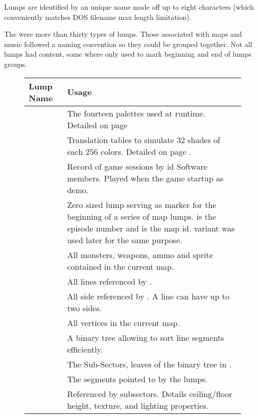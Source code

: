 Lumps are identified by an unique name made off up to eight characters (which conveniently matches DOS filename max length limitation).\\
\par
{}
\par
The were more than thirty types of lumps. Those associated with maps and music followed a naming convention so they could be grouped together. Not all lumps had content, some where only used to mark beginning and end of lumps groups.
\pagebreak

\begin{figure}[H]
\centering  
\begin{tabularx}{\textwidth}{ L{0.2}  L{0.8}}
  \toprule
  \textbf{Lump Name} &  \textbf{Usage} \\
   
  \toprule 
   & The fourteen palettes used at runtime. Detailed on page \pageref{label_palettes} \\
   & Translation tables to simulate 32 shades of each 256 colors. Detailed on page \pageref{diminishedlightning}. \\
   &  Record of game sessions by id Software members. Played when the game startup as demo.\\
  \toprule
   & Zero sized lump serving as marker for the beginning of a series of map lumps.  is the episode number and  is the map id.  variant was used later for the same purpose.\\
   & All monsters, weapons, ammo and sprite contained in the current map.\\
   & All lines referenced by .\\
   & All side referenced by . A line can have up to two sides.\\
   & All vertices in the current map.\\
   & A binary tree allowing to sort line segments efficiently. \\
   &  The Sub-Sectors, leaves of the binary tree in .  \\
   &  The segments pointed to by the  lumps.\\
   &  Referenced by subsectors. Details ceiling/floor height, texture, and lighting properties.\\
  

\end{tabularx}
\end{figure}
